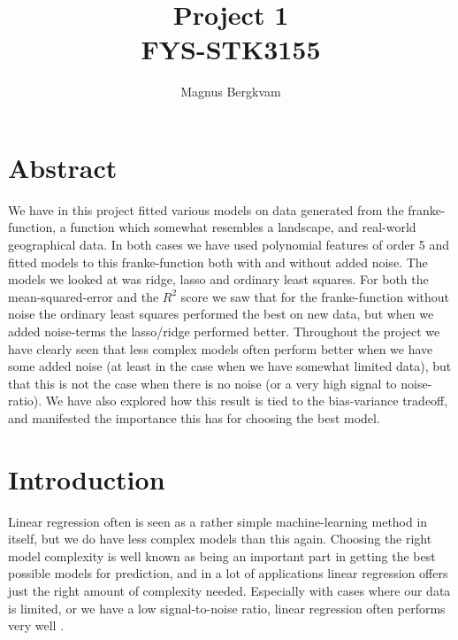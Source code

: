 \documentclass{article}
\author{Magnus Bergkvam}
\title{Project 1 \\ FYS-STK3155}
\begin{document}
\maketitle


\section{Abstract}
We have in this project fitted various models on data generated from the
franke-function, a function which somewhat resembles a landscape, and real-world
geographical data. In both cases we have used polynomial features of
order 5 and fitted models to this franke-function both with and without added
noise.  The models we looked at was ridge, lasso and ordinary least squares.
For both the mean-squared-error and the $R^2$ score we saw that for the
franke-function without noise the ordinary least squares performed the best on
new data, but when we added noise-terms the lasso/ridge performed better.
Throughout the project we have clearly seen that less complex models often
perform better when we have some added noise (at least in the case when we have
somewhat limited data), but that this is not the case when there is no noise (or
a very high signal to noise-ratio). We have also explored how this result is
tied to the bias-variance tradeoff, and manifested the importance this has for
choosing the best model.

\section{Introduction}
Linear regression often is seen as a rather simple machine-learning method in
itself, but we do have less complex models than this again. Choosing the right
model complexity is well known as being an important part in getting the best
possible models for prediction, and in a lot of applications linear regression
offers just the right amount of complexity needed. Especially with cases where
our data is limited, or we have a low signal-to-noise ratio, linear regression
often performs very well \cite{hastie2009elements}. \\
\end{document}

